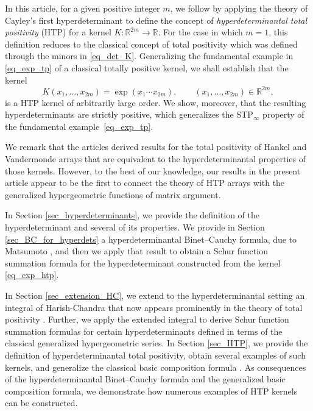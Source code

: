 \documentclass[pdftex]{sigma}
\numberwithin{equation}{section}
\def\R{{\mathbb R}}
\begin{document}
In this article, for a given positive integer $m$, we follow \cite{Johnson_Richards,wanglixu} by applying the theory of Cayley's first hyperdeterminant to define the concept of {\it hyperdeterminantal total positivity} (HTP) for a kernel $K \colon \R^{2m} \to \R$. For the case in which $m=1$, this definition reduces to the classical concept of total positivity which was defined through the minors in \eqref{eq_det_K}. Generalizing the fundamental example in \eqref{eq_exp_tp} of a classical totally positive kernel, we shall establish that the kernel
\begin{equation}
K(x_1,\dots,x_{2m}) = \exp(x_1\cdots x_{2m}), \qquad (x_1,\dots,x_{2m}) \in \R^{2m},\label{eq_exp_htp}
\end{equation}
is a HTP kernel of arbitrarily large order. We show, moreover, that the resulting hyperdeterminants are strictly positive, which generalizes the STP$_\infty$ property of the fundamental example~\eqref{eq_exp_tp}.

We remark that the articles \cite{wanglixu} derived results for the total positivity of Hankel and Vandermonde arrays that are equivalent to the hyperdeterminantal properties of those kernels. However, to the best of our knowledge, our results in the present article appear to be the first to connect the theory of HTP arrays with the generalized hypergeometric functions of matrix argument.

In Section \ref{sec_hyperdeterminants}, we provide the definition of the hyperdeterminant and several of its properties. We provide in Section \ref{sec_BC_for_hyperdets} a hyperdeterminantal Binet--Cauchy formula, due to Matsumoto \cite{matsumoto}, and then we apply that result to obtain a Schur function summation formula for the hyperdeterminant constructed from the kernel \eqref{eq_exp_htp}.

In Section \ref{sec_extension_HC}, we extend to the hyperdeterminantal setting an integral of Harish-Chandra \cite{harishchandra} that now appears prominently in the theory of total positivity \cite{grossrichards89,grossrichards95}. Further, we apply the extended integral to derive Schur function summation formulas for certain hyperdeterminants defined in terms of the classical generalized hypergeometric series. In Section \ref{sec_HTP}, we provide the definition of hyperdeterminantal total positivity, obtain several examples of such kernels, and generalize the classical basic composition formula \cite[p.~17]{Karlin}. As consequences of the hyperdeterminantal Binet--Cauchy formula and the generalized basic composition formula, we demonstrate how numerous examples of HTP kernels can be constructed.
\end{document}
